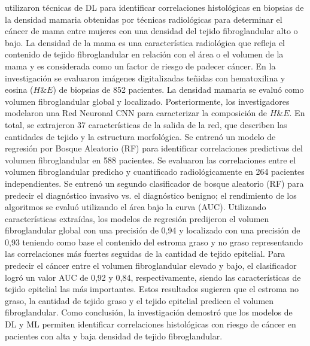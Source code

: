 \cite{Mullooly2019} utilizaron técnicas de DL para identificar correlaciones histológicas en biopsias de la densidad mamaria obtenidas por técnicas radiológicas para determinar el cáncer de mama entre mujeres con una densidad del tejido fibroglandular alto o bajo. La densidad de la mama es una característica radiológica que refleja el contenido de tejido fibroglandular en relación con el área o el volumen de la mama y es considerada como un factor de riesgo de padecer cáncer. En la investigación se evaluaron imágenes digitalizadas teñidas con hematoxilina y eosina ($H\&E$) de biopsias de 852 pacientes. La densidad mamaria se evaluó como volumen fibroglandular global y localizado. Posteriormente, los investigadores modelaron una Red Neuronal CNN para caracterizar la composición de $H\&E$. En total, se extrajeron 37 características de la salida de la red, que describen las cantidades de tejido y la estructura morfológica. Se entrenó un modelo de regresión por Bosque Aleatorio (RF) para identificar correlaciones predictivas del volumen fibroglandular en 588 pacientes. Se evaluaron las correlaciones entre el volumen fibroglandular predicho y cuantificado radiológicamente en 264 pacientes independientes. Se entrenó un segundo clasificador de bosque aleatorio (RF) para predecir el diagnóstico invasivo vs. el diagnóstico benigno; el rendimiento de los algoritmos se evaluó utilizando el área bajo la curva (AUC). Utilizando características extraídas, los modelos de regresión predijeron el volumen fibroglandular global con una precisión de 0,94 y localizado con una precisión de 0,93 teniendo como base el contenido del estroma graso y no graso representando las correlaciones más fuertes seguidas de la cantidad de tejido epitelial. Para predecir el cáncer entre el volumen fibroglandular elevado y bajo, el clasificador logró un valor AUC de 0,92 y 0,84, respectivamente, siendo las características de tejido epitelial las más importantes. Estos resultados sugieren que el estroma no graso, la cantidad de tejido graso y el tejido epitelial predicen el volumen fibroglandular. Como conclusión, la investigación demostró que los modelos de DL y ML permiten identificar correlaciones histológicas con riesgo de cáncer en pacientes con alta y baja densidad de tejido fibroglandular.

